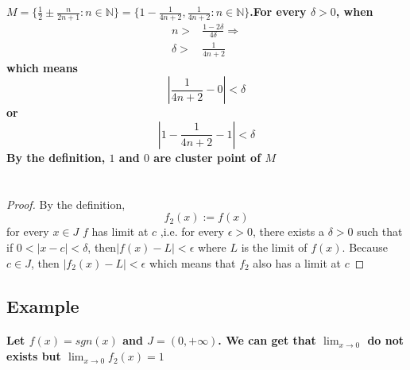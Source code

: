\documentclass{article}
\begin{document}
    \section{}
        \paragraph{
            $M=\{\frac{1}{2}\pm \frac{n}{2n+1}:n\in \mathbb{N}\}=\{1-\frac{1}{4n+2},\frac{1}{4n+2}:n\in \mathbb{N}\}$.For every $\delta >0$, when 
            \begin{equation*}
                \begin{split}
                    n>&\frac{1-2\delta}{4\delta}\Rightarrow\\
                    \delta>&\frac{1}{4n+2}
                \end{split}
            \end{equation*}
            which means $$|\frac{1}{4n+2}-0|<\delta$$
            or 
            $$|1-\frac{1}{4n+2}-1|<\delta$$
            By the definition, $1$ and $0$ are cluster point of $M$
        }
    
    \section{}
        \begin{proof}
            By the definition,$$f_2(x):=f(x)$$
            for every $x\in J$
            $f$ has limit at $c$ ,i.e. for every $\epsilon>0$, there exists a $\delta>0$ such that if $0<|x-c|<\delta$, then$|f(x)-L|<\epsilon$ where $L$ is the limit of $f(x)$.
            Because $c\in J$, then $|f_2(x)-L|<\epsilon$ which means that $f_2$ also has a limit at $c$
        \end{proof}
        \subsection*{Example}
        \paragraph{
            Let $f(x)=sgn(x)$ and $J=(0,+\infty)$. We can get that $\lim_{x\rightarrow 0}$ do not exists but $\lim_{x\rightarrow 0} f_2(x)=1$
        }
\end{document}

